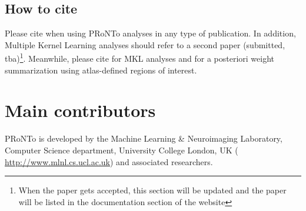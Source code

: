 \subsection{How to cite}
Please cite \cite{Schrouff2013} when using PRoNTo analyses in any type of publication. In addition, Multiple Kernel Learning analyses should refer to a second paper (submitted, tba)\footnote{When the paper gets accepted, this section will be updated and the paper will be listed in the documentation section of the website}. Meanwhile, please cite \cite{Schrouff2014} for MKL analyses and \cite{Schrouff2013a} for a posteriori weight summarization using atlas-defined regions of interest. 

\section{Main contributors}
PRoNTo is  developed by the Machine Learning \& Neuroimaging Laboratory, Computer Science department, University College London, UK (\url{ http://www.mlnl.cs.ucl.ac.uk}) and associated researchers.

